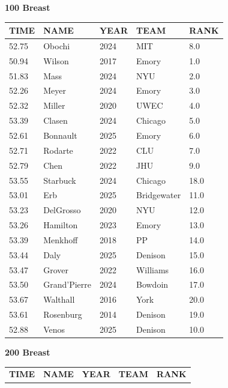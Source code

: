 \begin{table}[H]
\centering
\begin{minipage}[t]{0.48\textwidth}
\centering
\textbf{100 Breast}\\[0.1cm]
\begin{tabular}{@{}p{1.8cm}p{2.8cm}p{1.2cm}p{1.4cm}p{0.8cm}@{}}
\hline
    \textbf{TIME} & \textbf{NAME} & \textbf{YEAR} & \textbf{TEAM} & \textbf{RANK} \\
\hline
    52.75 & Obochi & 2024 & MIT & 8.0 \\
    50.94 & Wilson & 2017 & Emory & 1.0 \\
    51.83 & Mass & 2024 & NYU & 2.0 \\
    52.26 & Meyer & 2024 & Emory & 3.0 \\
    52.32 & Miller & 2020 & UWEC & 4.0 \\
    53.39 & Clasen & 2024 & Chicago & 5.0 \\
    52.61 & Bonnault & 2025 & Emory & 6.0 \\
    52.71 & Rodarte & 2022 & CLU & 7.0 \\
    52.79 & Chen & 2022 & JHU & 9.0 \\
    53.55 & Starbuck & 2024 & Chicago & 18.0 \\
    53.01 & Erb & 2025 & Bridgewater & 11.0 \\
    53.23 & DelGrosso & 2020 & NYU & 12.0 \\
    53.26 & Hamilton & 2023 & Emory & 13.0 \\
    53.39 & Menkhoff & 2018 & PP & 14.0 \\
    53.44 & Daly & 2025 & Denison & 15.0 \\
    53.47 & Grover & 2022 & Williams & 16.0 \\
    53.50 & Grand'Pierre & 2024 & Bowdoin & 17.0 \\
    53.67 & Walthall & 2016 & York & 20.0 \\
    53.61 & Rosenburg & 2014 & Denison & 19.0 \\
    52.88 & Venos & 2025 & Denison & 10.0 \\
\hline
\end{tabular}
\end{minipage}\hfill
\begin{minipage}[t]{0.48\textwidth}
\centering
\textbf{200 Breast}\\[0.1cm]
\begin{tabular}{@{}p{1.8cm}p{2.8cm}p{1.2cm}p{1.4cm}p{0.8cm}@{}}
\hline
    \textbf{TIME} & \textbf{NAME} & \textbf{YEAR} & \textbf{TEAM} & \textbf{RANK} \\

\end{tabular}
\end{minipage}
\end{table}

